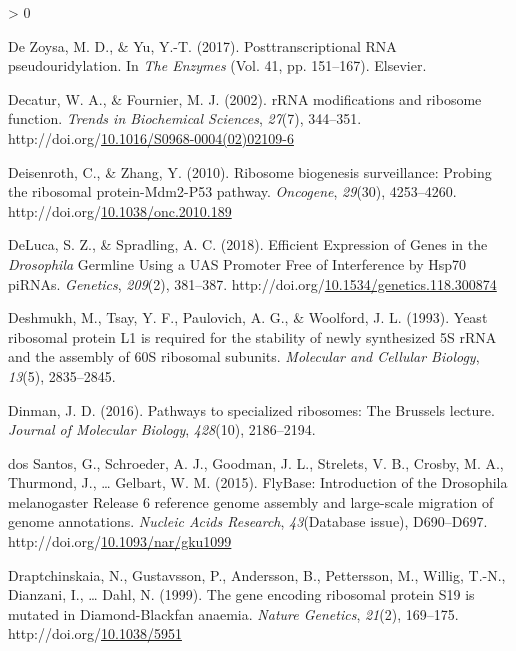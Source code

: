 \documentclass[12pt,oneside]{reedthesis}
\newlength{\cslhangindent}
\newenvironment{CSLReferences}[2] %
 {%
  \setlength{\parindent}{0pt}
  \ifodd #1 \everypar{\setlength{\hangindent}{\cslhangindent}}\ignorespaces\fi
  \ifnum #2 > 0
  \setlength{\parskip}{#2\baselineskip}
  \fi
 }%
 {}
\begin{document}
\begin{CSLReferences}{1}{0}
\leavevmode\hypertarget{ref-DeZoysa2017}{}%
De Zoysa, M. D., \& Yu, Y.-T. (2017). Posttranscriptional {RNA} pseudouridylation. In \emph{The {Enzymes}} (Vol. 41, pp. 151--167). {Elsevier}.

\leavevmode\hypertarget{ref-Decatur2002b}{}%
Decatur, W. A., \& Fournier, M. J. (2002). {rRNA} modifications and ribosome function. \emph{Trends in Biochemical Sciences}, \emph{27}(7), 344--351. http://doi.org/\href{https://doi.org/10.1016/S0968-0004(02)02109-6}{10.1016/S0968-0004(02)02109-6}

\leavevmode\hypertarget{ref-Deisenroth2010e}{}%
Deisenroth, C., \& Zhang, Y. (2010). Ribosome biogenesis surveillance: {Probing} the ribosomal protein-{Mdm2}-P53 pathway. \emph{Oncogene}, \emph{29}(30), 4253--4260. http://doi.org/\href{https://doi.org/10.1038/onc.2010.189}{10.1038/onc.2010.189}

\leavevmode\hypertarget{ref-delucaEfficientExpressionGenes2018}{}%
DeLuca, S. Z., \& Spradling, A. C. (2018). Efficient {Expression} of {Genes} in the {\emph{Drosophila}} {Germline Using} a {UAS Promoter Free} of {Interference} by {Hsp70 piRNAs}. \emph{Genetics}, \emph{209}(2), 381--387. http://doi.org/\href{https://doi.org/10.1534/genetics.118.300874}{10.1534/genetics.118.300874}

\leavevmode\hypertarget{ref-Deshmukh1993a}{}%
Deshmukh, M., Tsay, Y. F., Paulovich, A. G., \& Woolford, J. L. (1993). Yeast ribosomal protein {L1} is required for the stability of newly synthesized {5S rRNA} and the assembly of {60S} ribosomal subunits. \emph{Molecular and Cellular Biology}, \emph{13}(5), 2835--2845.

\leavevmode\hypertarget{ref-Dinman2016a}{}%
Dinman, J. D. (2016). Pathways to specialized ribosomes: The {Brussels} lecture. \emph{Journal of Molecular Biology}, \emph{428}(10), 2186--2194.

\leavevmode\hypertarget{ref-dossantosFlyBaseIntroductionDrosophila2015}{}%
dos Santos, G., Schroeder, A. J., Goodman, J. L., Strelets, V. B., Crosby, M. A., Thurmond, J., \ldots{} Gelbart, W. M. (2015). {FlyBase}: Introduction of the {Drosophila} melanogaster {Release} 6 reference genome assembly and large-scale migration of genome annotations. \emph{Nucleic Acids Research}, \emph{43}(Database issue), D690--D697. http://doi.org/\href{https://doi.org/10.1093/nar/gku1099}{10.1093/nar/gku1099}

\leavevmode\hypertarget{ref-draptchinskaiaGeneEncodingRibosomal1999}{}%
Draptchinskaia, N., Gustavsson, P., Andersson, B., Pettersson, M., Willig, T.-N., Dianzani, I., \ldots{} Dahl, N. (1999). The gene encoding ribosomal protein {S19} is mutated in {Diamond}-{Blackfan} anaemia. \emph{Nature Genetics}, \emph{21}(2), 169--175. http://doi.org/\href{https://doi.org/10.1038/5951}{10.1038/5951}


\end{CSLReferences}
\end{document}
